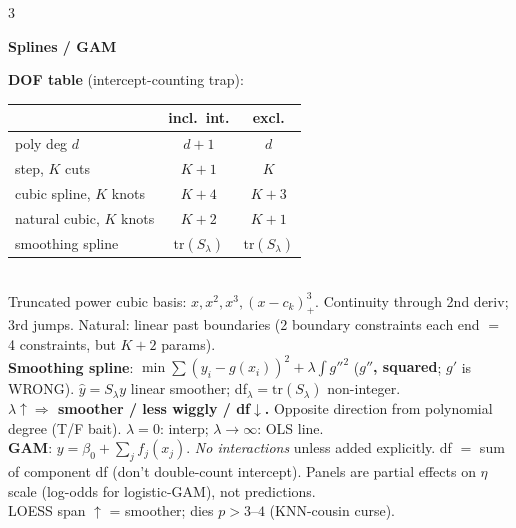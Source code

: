 \documentclass[a4paper,9pt]{extarticle}
\newcommand{\tr}{\mathrm{tr}}
\newcommand{\hd}[1]{\textbf{#1}}
\newcommand{\sect}[1]{\par\vspace{1pt}\noindent\colorbox{black!10}{\parbox{\dimexpr\linewidth-2\fboxsep\relax}{\strut\textbf{#1}\strut}}\par\vspace{1pt}}
\begin{document}
\begin{multicols*}{3}
\sect{Splines / GAM}
\hd{DOF table} (intercept-counting trap):
\begin{tabular}{l|cc}
 & incl.\ int. & excl.\\\hline
poly deg $d$ & $d{+}1$ & $d$\\
step, $K$ cuts & $K{+}1$ & $K$\\
cubic spline, $K$ knots & $K{+}4$ & $K{+}3$\\
natural cubic, $K$ knots & $K{+}2$ & $K{+}1$\\
smoothing spline & $\tr(S_\lambda)$ & $\tr(S_\lambda)$
\end{tabular}\\
Truncated power cubic basis: $x,x^2,x^3,(x-c_k)^3_+$. Continuity through 2nd deriv; 3rd jumps. Natural: linear past boundaries (2 boundary constraints each end $=$ 4 constraints, but $K{+}2$ params).\\
\hd{Smoothing spline}: $\min\sum(y_i-g(x_i))^2+\lambda\!\int g''^2$ (\hd{$g''$, squared}; $g'$ is WRONG). $\hat y=S_\lambda y$ linear smoother; df$_\lambda=\tr(S_\lambda)$ non-integer.\\
\hd{$\lambda\uparrow\Rightarrow$ smoother / less wiggly / df$\downarrow$.} Opposite direction from polynomial degree (T/F bait). $\lambda{=}0$: interp; $\lambda{\to}\infty$: OLS line.\\
\hd{GAM}: $y=\beta_0+\sum_j f_j(x_j)$. \emph{No interactions} unless added explicitly. df $=$ sum of component df (don't double-count intercept). Panels are partial effects on $\eta$ scale (log-odds for logistic-GAM), not predictions.\\
LOESS span $\uparrow$ = smoother; dies $p>3\text{--}4$ (KNN-cousin curse).


\end{multicols*}
\end{document}
